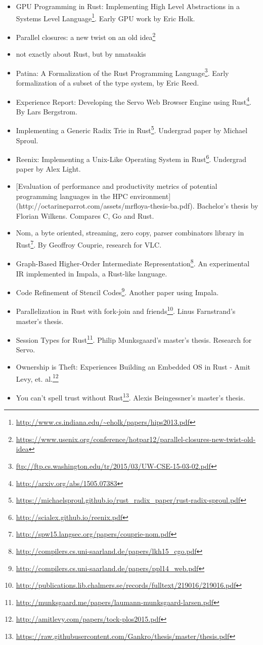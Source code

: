\documentclass[a4paper,]{book}
\renewcommand{\href}[2]{#2\footnote{\url{#1}}}
\begin{document}
\begin{itemize}
\itemsep1pt\parskip0pt
\item
  \href{http://www.cs.indiana.edu/~eholk/papers/hips2013.pdf}{GPU
  Programming in Rust: Implementing High Level Abstractions in a Systems
  Level Language}. Early GPU work by Eric Holk.
\item
  \href{https://www.usenix.org/conference/hotpar12/parallel-closures-new-twist-old-idea}{Parallel
  closures: a new twist on an old idea}
\item
  not exactly about Rust, but by nmatsakis
\item
  \href{ftp://ftp.cs.washington.edu/tr/2015/03/UW-CSE-15-03-02.pdf}{Patina:
  A Formalization of the Rust Programming Language}. Early formalization
  of a subset of the type system, by Eric Reed.
\item
  \href{http://arxiv.org/abs/1505.07383}{Experience Report: Developing
  the Servo Web Browser Engine using Rust}. By Lars Bergstrom.
\item
  \href{https://michaelsproul.github.io/rust_radix_paper/rust-radix-sproul.pdf}{Implementing
  a Generic Radix Trie in Rust}. Undergrad paper by Michael Sproul.
\item
  \href{http://scialex.github.io/reenix.pdf}{Reenix: Implementing a
  Unix-Like Operating System in Rust}. Undergrad paper by Alex Light.
\item
  {[}Evaluation of performance and productivity metrics of potential
  programming languages in the HPC environment{]}
  (http://octarineparrot.com/assets/mrfloya-thesis-ba.pdf). Bachelor's
  thesis by Florian Wilkens. Compares C, Go and Rust.
\item
  \href{http://spw15.langsec.org/papers/couprie-nom.pdf}{Nom, a byte
  oriented, streaming, zero copy, parser combinators library in Rust}.
  By Geoffroy Couprie, research for VLC.
\item
  \href{http://compilers.cs.uni-saarland.de/papers/lkh15_cgo.pdf}{Graph-Based
  Higher-Order Intermediate Representation}. An experimental IR
  implemented in Impala, a Rust-like language.
\item
  \href{http://compilers.cs.uni-saarland.de/papers/ppl14_web.pdf}{Code
  Refinement of Stencil Codes}. Another paper using Impala.
\item
  \href{http://publications.lib.chalmers.se/records/fulltext/219016/219016.pdf}{Parallelization
  in Rust with fork-join and friends}. Linus Farnstrand's master's
  thesis.
\item
  \href{http://munksgaard.me/papers/laumann-munksgaard-larsen.pdf}{Session
  Types for Rust}. Philip Munksgaard's master's thesis. Research for
  Servo.
\item
  \href{http://amitlevy.com/papers/tock-plos2015.pdf}{Ownership is
  Theft: Experiences Building an Embedded OS in Rust - Amit Levy, et.
  al.}
\item
  \href{https://raw.githubusercontent.com/Gankro/thesis/master/thesis.pdf}{You
  can't spell trust without Rust}. Alexis Beingessner's master's thesis.
\end{itemize}
\end{document}
